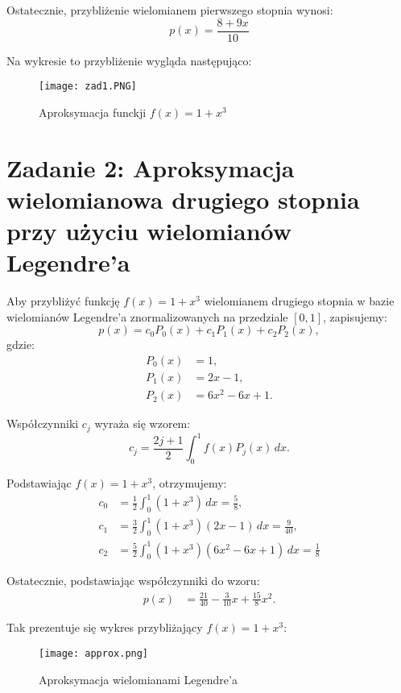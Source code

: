 \documentclass{article}
\begin{document}
Ostatecznie, przybliżenie wielomianem pierwszego stopnia wynosi:
\begin{equation}
p(x) = \frac{8 + 9x}{10}
\end{equation}

Na wykresie to przybliżenie wygląda następująco:

\begin{figure}
    \centering
    \texttt{[image: zad1.PNG]}
    \caption{Aproksymacja funckji $f(x)=1+x^3$}
    \label{fig:enter-label}
\end{figure}

\section{Zadanie 2: Aproksymacja wielomianowa drugiego stopnia przy użyciu wielomianów Legendre’a}

Aby przybliżyć funkcję $f(x) = 1 + x^3$ wielomianem drugiego stopnia w bazie wielomianów Legendre’a znormalizowanych na przedziale $[0,1]$, zapisujemy:
\begin{equation}
p(x) = c_0 P_0(x) + c_1 P_1(x) + c_2 P_2(x),
\end{equation}
gdzie:
\begin{align*}
P_0(x) &= 1, \\
P_1(x) &= 2x - 1, \\
P_2(x) &= 6x^2 - 6x + 1.
\end{align*}

Współczynniki $c_j$ wyraża się wzorem:
\begin{equation}
c_j = \frac{2j + 1}{2} \int_0^1 f(x) P_j(x)\, dx.
\end{equation}

Podstawiając $f(x) = 1 + x^3$, otrzymujemy:
\begin{align*}
c_0 &= \frac{1}{2} \int_0^1 (1 + x^3)\, dx = \frac{5}{8}, \\
c_1 &= \frac{3}{2} \int_0^1 (1 + x^3)(2x - 1)\, dx = \frac{9}{40} , \\
c_2 &= \frac{5}{2} \int_0^1 (1 + x^3)(6x^2 - 6x + 1)\, dx = \frac{1}{8}
\end{align*}

Ostatecznie, podstawiając współczynniki do wzoru:
\begin{align*}
p(x) &= \frac{21}{40} - \frac{3}{10}x + \frac{15}{8}x^2.
\end{align*}

Tak prezentuje się wykres przybliżający $f(x) = 1 + x ^ 3$:
\begin{figure}[H]
    \centering
    \texttt{[image: approx.png]}
    \caption{Aproksymacja wielomianami Legendre'a}
    \label{fig:enter-label}
\end{figure}
\end{document}

